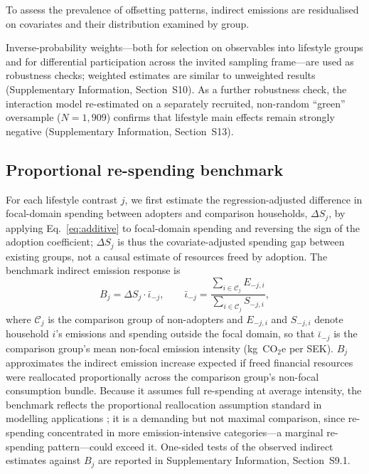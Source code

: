 \documentclass[sn-nature]{sn-jnl}
\begin{document}
To assess the prevalence of offsetting patterns, indirect emissions are residualised on covariates and their distribution examined by group. 

Inverse-probability weights---both for selection on observables into lifestyle groups and for differential participation across the invited sampling frame---are used as robustness checks; weighted estimates are similar to unweighted results (Supplementary Information, Section~S10). As a further robustness check, the interaction model re-estimated on a separately recruited, non-random ``green'' oversample ($N=1{,}909$) confirms that lifestyle main effects remain strongly negative (Supplementary Information, Section~S13).

\subsection{Proportional re-spending benchmark}
For each lifestyle contrast $j$, we first estimate the regression-adjusted difference in focal-domain spending between adopters and comparison households, $\Delta S_j$, by applying Eq.~\eqref{eq:additive} to focal-domain spending and reversing the sign of the adoption coefficient; $\Delta S_j$ is thus the covariate-adjusted spending gap between existing groups, not a causal estimate of resources freed by adoption. The benchmark indirect emission response is
\begin{equation}\label{eq:benchmark}
B_j = \Delta S_j \cdot \bar{\iota}_{-j}, \qquad \bar{\iota}_{-j} = \frac{\sum_{i \in \mathcal{C}_j} E_{-j,i}}{\sum_{i \in \mathcal{C}_j} S_{-j,i}},
\end{equation}
where $\mathcal{C}_j$ is the comparison group of non-adopters and $E_{-j,i}$ and $S_{-j,i}$ denote household $i$'s emissions and spending outside the focal domain, so that $\bar{\iota}_{-j}$ is the comparison group's mean non-focal emission intensity (kg~CO$_2$e per SEK). $B_j$ approximates the indirect emission increase expected if freed financial resources were reallocated proportionally across the comparison group's non-focal consumption bundle. Because it assumes full re-spending at average intensity, the benchmark reflects the proportional reallocation assumption standard in modelling applications \citep{Bjelle2018,Chitnis2014,grabs2015rebound}; it is a demanding but not maximal comparison, since re-spending concentrated in more emission-intensive categories---a marginal re-spending pattern---could exceed it. One-sided tests of the observed indirect estimates against $B_j$ are reported in Supplementary Information, Section~S9.1.
\end{document}
